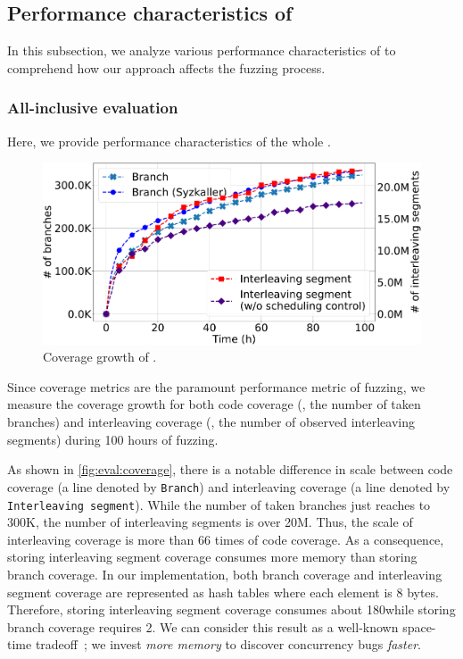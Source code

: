 \subsection{Performance characteristics of \sys}
\label{ss:characteristics}

In this subsection, we analyze various performance characteristics of
\sys to comprehend how our approach affects the fuzzing process.
%
\subsubsection{All-inclusive evaluation}
\label{sss:allinclusive}

Here, we provide performance characteristics of the whole \sys.


%
\begin{figure}[t]
  \centering
  \includegraphics[width=0.9\linewidth]{fig/coverage_graph-crop.pdf}
  \caption{Coverage growth of \sys.}
  \label{fig:eval:coverage}
  \vspace{-8pt}
\end{figure}
%
Since coverage metrics are the paramount performance metric of
fuzzing, we measure the coverage growth for both code coverage (\ie,
the number of taken branches) and interleaving coverage (\ie, the
number of observed interleaving segments) during 100 hours of fuzzing.

As shown in \autoref{fig:eval:coverage}, there is a notable difference
in scale between code coverage (a line denoted by \texttt{Branch}) and
interleaving coverage (a line denoted by \texttt{Interleaving segment}).
%
While the number of taken branches just reaches to 300K, the number of
interleaving segments is over 20M. Thus, the scale of interleaving
coverage is more than 66 times of code coverage.
%
As a consequence, storing interleaving segment coverage consumes more
memory than storing branch coverage.
%
In our implementation, both branch coverage and interleaving segment
coverage are represented as hash tables where each element is 8
bytes. Therefore, storing interleaving segment coverage consumes about
180\MB while storing branch coverage requires 2\MB.
%
We can consider this result as a well-known space-time
tradeoff~\cite{spacetimetradeoff}; we invest \textit{more memory} to
discover concurrency bugs \textit{faster}.
%


